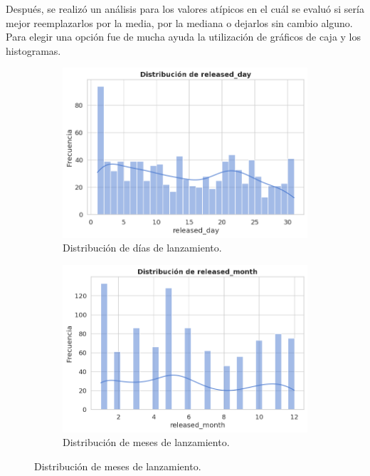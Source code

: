 \documentclass{article}
\begin{document}
	Después, se realizó un análisis para los valores atípicos en el cuál se evaluó si sería mejor reemplazarlos por la media, por la mediana o dejarlos sin cambio alguno. Para elegir una opción fue de mucha ayuda la utilización de gráficos de caja y los histogramas.
	
	\begin{figure}[h!]
		\centering
		\begin{subfigure}[b]{0.45\linewidth}
			\centering
			\includegraphics[width=\linewidth]{./day_hist.png}
			\caption{Distribución de días de lanzamiento.}
		\end{subfigure}
		\hfill
		\begin{subfigure}[b]{0.45\linewidth}
			\centering
			\includegraphics[width=\linewidth]{./month_hist.png}
			\caption{Distribución de meses de lanzamiento.}
		\end{subfigure}

\end{figure}
\end{document}
